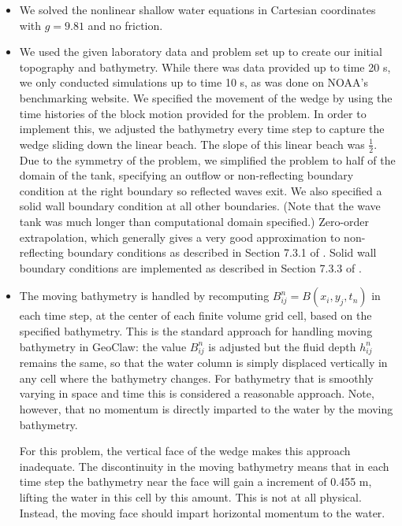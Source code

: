 \begin{itemize}
\item We solved the nonlinear shallow water equations in Cartesian
coordinates with $g=9.81$ and no friction.

\item We used the given laboratory data and problem set up to create our
initial topography and bathymetry.  While there was data provided up to
time 20 s, we only conducted simulations up to time 10 s, as was done on 
NOAA's benchmarking website.  We specified the movement of the wedge
by using the time histories of the block motion provided for the problem.  
In order to implement this, we adjusted the bathymetry every time step to
capture the wedge sliding down the linear beach.  The slope of this linear
beach was $\frac{1}{2}$.  Due to the symmetry of the problem, we simplified the
problem to half of the domain of the tank, specifying an outflow or non-reflecting
boundary condition at the right boundary so reflected waves exit.  We also
specified a solid wall boundary condition at all other boundaries.
(Note that the wave tank was much longer than computational domain specified.)
Zero-order extrapolation,
which generally gives a very good approximation to non-reflecting boundary
conditions as described in Section 7.3.1 of \cite{rjl:fvmhp}.  Solid wall
boundary conditions are implemented as described in Section 7.3.3 of
\cite{rjl:fvmhp}.


\item  The moving bathymetry is handled by recomputing $B_{ij}^n =
B(x_i,y_j,t_n)$ in
each time step, at the center of each finite volume grid cell, based on the
specified bathymetry.
This is the standard approach
for handling moving bathymetry in GeoClaw:  the value $B_{ij}^n$ is adjusted
but the fluid depth $h_{ij}^n$ remains the same, so that the water column is
simply displaced vertically in any cell where the bathymetry changes.  For
bathymetry that is smoothly varying  in space and time
this is considered a reasonable approach.  Note, however, that no momentum
is directly imparted to the water by the moving bathymetry.  

For this problem, the vertical face of the wedge makes this approach
inadequate.  The discontinuity in the moving bathymetry means that in each
time step the bathymetry near the face will gain a increment of 0.455 m,
lifting the water in this cell by this amount.  This is not at all physical.
Instead, the moving face should impart horizontal momentum to the water.


\end{itemize}
